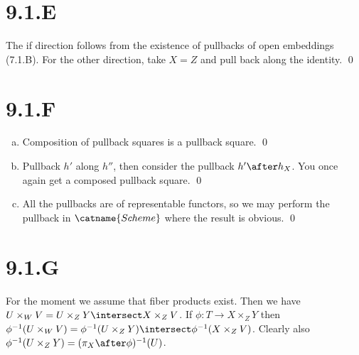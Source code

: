 \documentclass{article}
\begin{document}
\section{9.1.E}
The if direction follows from the existence of pullbacks of open embeddings
(7.1.B). For the other direction, take $X=Z$ and pull back
along the identity. \qed

\section{9.1.F}
\begin{enumerate}[a.]
    \item Composition of pullback squares is a pullback square. \qed
    \item Pullback $h'$ along $h''$, then consider the
          pullback $h' \after h_X$. You once again get a composed pullback square.
          \qed
    \item All the pullbacks are of representable functors, so we may perform the pullback
          in $\catname{Scheme}$ where the result is obvious. \qed
\end{enumerate}

\section{9.1.G}
For the moment we assume that fiber products exist. Then we have
$U\times_WV = U\times_ZY \intersect X\times_ZV$. If $\phi: T \to X\times_ZY$ then
$\phi^{-1}(U\times_WV)=\phi^{-1}(U\times_ZY
    ) \intersect
    \phi^{-1}(X\times_ZV)$. Clearly also $\phi^{-1}(U\times_ZY)=(\pi_X \after
    \phi)^{-1}(U)$.
\end{document}
